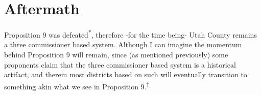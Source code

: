 \section{Aftermath}

Proposition 9 was defeated\textsuperscript{*}, therefore -for the time being- Utah County remains a three commissioner based system. Although I can imagine the momentum behind Proposition 9 will remain, since (as mentioned previously) some proponents claim that the three commissioner based system is a historical artifact, and therein most districts based on such will eventually transition to something akin what we see in Proposition 9.\textsuperscript{‡}
